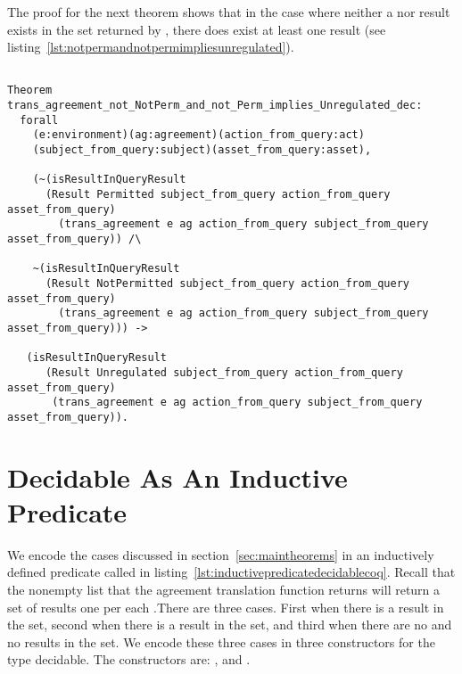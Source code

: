 The proof for the next theorem  shows that in the case where neither a  nor  result exists in the set returned by , there does exist at least one  result (see listing~\ref{lst:notpermandnotpermimpliesunregulated}).

\begin{lstlisting}

Theorem trans_agreement_not_NotPerm_and_not_Perm_implies_Unregulated_dec:
  forall
    (e:environment)(ag:agreement)(action_from_query:act)
    (subject_from_query:subject)(asset_from_query:asset),

    (~(isResultInQueryResult 
      (Result Permitted subject_from_query action_from_query asset_from_query)
        (trans_agreement e ag action_from_query subject_from_query asset_from_query)) /\

    ~(isResultInQueryResult 
      (Result NotPermitted subject_from_query action_from_query asset_from_query)
        (trans_agreement e ag action_from_query subject_from_query asset_from_query))) ->

   (isResultInQueryResult 
      (Result Unregulated subject_from_query action_from_query asset_from_query)
       (trans_agreement e ag action_from_query subject_from_query asset_from_query)).
\end{lstlisting}


\section{Decidable As An Inductive Predicate}

We encode the cases discussed in section~\ref{sec:maintheorems} in an inductively defined predicate called  in listing~\ref{lst:inductivepredicatedecidablecoq}. Recall that the nonempty list that the agreement translation function  returns will return a set of results one per each .There are three cases. First when there is a  result in the set, second when there is a  result in the set, and third when there are no  and no  results in the set. We encode these three cases in three constructors for the type decidable. The constructors are: ,  and .

